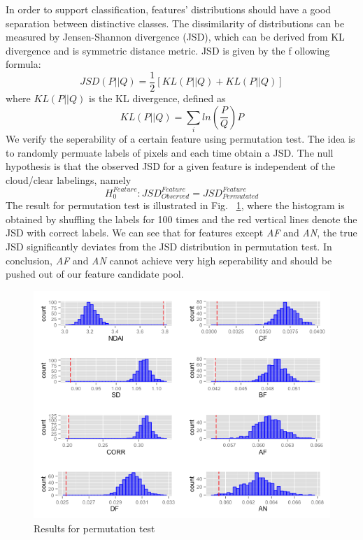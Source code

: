 \documentclass[english]{article}\usepackage{graphicx, color}
\numberwithin{equation}{section}
\numberwithin{figure}{section}
\begin{document}
In order to support classification, features' distributions should have a good 
separation between distinctive classes. The dissimilarity of distributions can 
be measured by Jensen-Shannon divergence (JSD), which can be derived 
from KL divergence and is symmetric distance metric. JSD is given by the f
ollowing formula:
\begin{equation}
JSD(P||Q) = \frac{1}{2} [KL(P||Q) + KL(P||Q)]
\end{equation}
where $KL(P||Q)$ is the KL divergence, defined as 
\begin{equation}
KL(P||Q) = \sum_i{ln(\frac{P}{Q})P}
\end{equation}
We verify the seperability of a certain feature using permutation test. The idea 
is to randomly permuate labels of pixels and each time obtain a JSD. The null 
hypothesis is that the observed JSD for a given feature is independent of the 
cloud/clear labelings, namely
\begin{equation}
H_0^{Feature}:JSD_{Observed}^{Feature}=JSD_{Permutated}^{Feature}
\end{equation}
The result for permutation test is illustrated in Fig. ~\ref{fig:PT}, where the 
histogram is obtained by shuffling the labels 
for 100 times and the red vertical lines 
denote the JSD with correct labels. We can see that for features except 
\textit{AF} and \textit{AN}, the true JSD significantly deviates from the JSD 
distribution in permutation test. In conclusion, \textit{AF} and \textit{AN} 
cannot achieve very high seperability and should be pushed out of our 
feature candidate pool.

\begin{figure}[!h]
  \begin{center}
    \includegraphics[width=\columnwidth]{figures/PermutationTest.png}
  \end{center}
  \caption{Results for permutation test}
  \label{fig:PT}
\end{figure}
\end{document}
